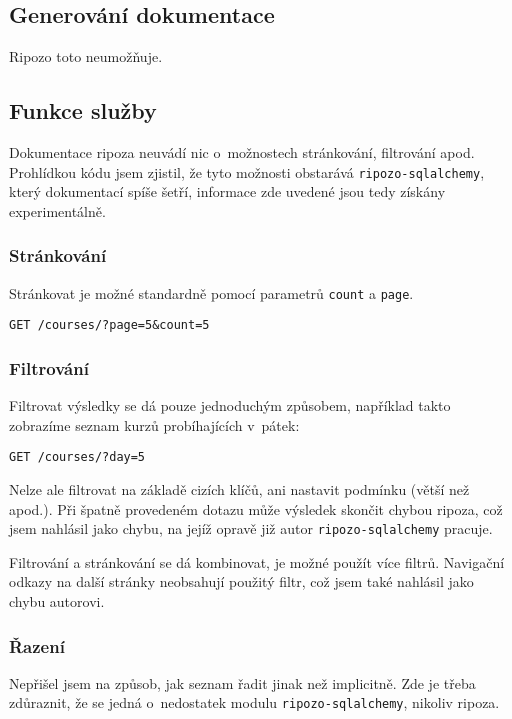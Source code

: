 \subsection{Generování dokumentace}\label{generovuxe1nuxed-dokumentace}

Ripozo toto neumožňuje.

\subsection{Funkce služby}\label{funkce-sluux17eby}

Dokumentace ripoza neuvádí nic o~možnostech stránkování, filtrování apod. Prohlídkou kódu jsem zjistil, že tyto možnosti obstarává \verb!ripozo-sqlalchemy!, který dokumentací spíše šetří, informace zde uvedené jsou tedy získány experimentálně.

\subsubsection*{Stránkování}\label{struxe1nkovuxe1nuxed}

Stránkovat je možné standardně pomocí parametrů \verb!count! a \verb!page!.

\verb!GET /courses/?page=5&count=5!

\subsubsection*{Filtrování}\label{filtrovuxe1nuxed}

Filtrovat výsledky se dá pouze jednoduchým způsobem, například takto zobrazíme seznam kurzů probíhajících v~pátek:

\verb!GET /courses/?day=5!

Nelze ale filtrovat na základě cizích klíčů, ani nastavit podmínku (větší než apod.). Při špatně provedeném dotazu může výsledek skončit chybou ripoza, což jsem nahlásil jako chybu, na jejíž opravě již autor \verb!ripozo-sqlalchemy! pracuje.

Filtrování a stránkování se dá kombinovat, je možné použít více filtrů. Navigační odkazy na další stránky neobsahují použitý filtr, což jsem také nahlásil jako chybu autorovi.

\subsubsection*{Řazení}\label{ux159azenuxed}

Nepřišel jsem na způsob, jak seznam řadit jinak než implicitně. Zde je třeba zdůraznit, že se jedná o~nedostatek modulu \verb!ripozo-sqlalchemy!, nikoliv ripoza.

